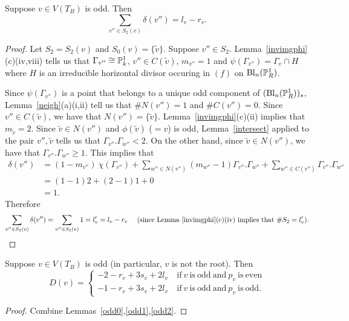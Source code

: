 \begin{lemma}\label{odd2}
Suppose $v \in V(T_B)$ is odd. Then
 \[ \sum_{v'' \in S_2(v)} \delta(v'') = l_v-r_v .\]
\end{lemma}
\begin{proof}
Let $S_2 = S_2(v)$ and $S_0(v) = \{ \tilde{v} \}$. Suppose $v'' \in S_2$. Lemma~\ref{invimgphi}(c)(iv,viii) tells us that $\Gamma_{v''} \isom \P^1_k$, $v'' \in C(\tilde{v})$, $m_{v''} = 1$ and $\psi(\Gamma_{v''}) = \Gamma_v \cap H$ where $H$ is an irreducible horizontal divisor occuring in $(f)$ on $\mathrm{Bl}_n(\P^1_R)$. 

Since $\psi(\Gamma_{v''})$ is a point that belongs to a unique odd component of $(\mathrm{Bl}_n(\P^1_R))_s$, Lemma~\ref{neigh}(a)(i,ii) tell us that $\# N(v'') = 1$ and $\# C(v'') = 0$. Since $v'' \in C(\tilde{v})$, we have that $N(v'') = \{ \tilde{v} \}$. Lemma~\ref{invimgphi}(c)(ii) implies that $m_{\tilde{v}} = 2$. Since $\tilde{v} \in N(v'')$ and $\phi(\tilde{v})$ ($=v$) is odd, Lemma~\ref{intersect} applied to the pair $v'',\tilde{v}$ tells us that $\Gamma_{v''}.\Gamma_{w''} < 2$. On the other hand, since $\tilde{v} \in N(v'')$, we have that $\Gamma_{v''}.\Gamma_{w''} \geq 1$. This implies that
\begin{align*} 
\delta(v'') &= (1-m_{v''})\ \chi(\Gamma_{v''}) + \sum_{w'' \in N({v''})} (m_{w''} - 1) \Gamma_{v''}.\Gamma_{w''} + \sum_{w'' \in C({v''})} \Gamma_{v''}.\Gamma_{w''} \\
&= (1-1)2 + (2-1)1 + 0 \\
&= 1 .
\end{align*}
Therefore
\[ \sum_{v'' \in S_2(v)} \delta(v'') = \sum_{v'' \in S_2(v)} 1 = l'_v = l_v-r_v \ \ \ \ ({\textup{since  Lemma~\ref{invimgphi}(c)(iv) implies that $\# S_2 = l'_v$}}) . \qedhere \] 
\end{proof}

\begin{lemma}\label{oddtotal}
 Suppose $v \in V(T_B)$ is odd (in particular, $v$ is not the root). Then 
 \[ D(v) = \left\{ 
 \begin{array}{ll}
 -2-r_v+3s_v+2l_v \ &\mathrm{if}\ v \ \mathrm{is\ odd \ and}\ p_v\ \mathrm{is\ even} \\                                                                                                                                                                                                                          
 -1-r_v+3s_v+2l_v \ &\mathrm{if}\ v \ \mathrm{is\ odd \ and}\ p_v\ \mathrm{is\ odd}  .
 \end{array}
 \right.  \]
\end{lemma}
\begin{proof}
 Combine Lemmas~\ref{odd0},\ref{odd1},\ref{odd2}.
\end{proof}

